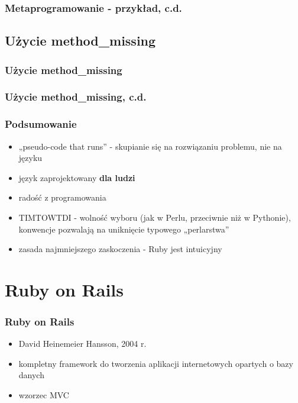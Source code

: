 \documentclass[12t]{beamer}
\begin{document}
\begin{frame}[fragile]
  \frametitle{Metaprogramowanie - przykład, c.d.}
  
\end{frame}

\subsection{Użycie method\_missing}
\begin{frame}[fragile]
  \frametitle{Użycie method\_missing}
  
\end{frame}

\begin{frame}[fragile]
  \frametitle{Użycie method\_missing, c.d.}
  
\end{frame}

\begin{frame}
  \frametitle{Podsumowanie}
  \begin{itemize}
  \item „pseudo-code that runs” - skupianie się na rozwiązaniu
    problemu, nie na języku
  \item język zaprojektowany \textbf{dla ludzi}
  \item radość z programowania
  \item TIMTOWTDI - wolność wyboru (jak w Perlu, przeciwnie niż w
    Pythonie), konwencje pozwalają na uniknięcie typowego „perlarstwa”
  \item zasada najmniejszego zaskoczenia - Ruby jest intuicyjny
  \end{itemize}
\end{frame}

\section{Ruby on Rails}
\begin{frame}
  \frametitle{Ruby on Rails}
  \begin{itemize}
  \item David Heinemeier Hansson, 2004 r.
  \item kompletny framework do tworzenia aplikacji internetowych
    opartych o bazy danych
  \item wzorzec MVC
  \end{itemize}
\end{frame}
\end{document}
